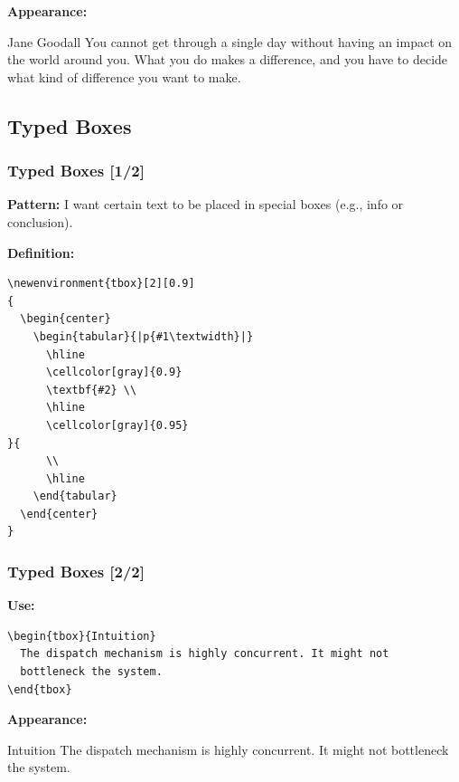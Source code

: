 {\begin{frame}[fragile]
  \pause
  \vspace{5mm}
  \textbf{Appearance:}
  \begin{inspiration}{Jane Goodall}
  You cannot get through a single day without having an impact on the world around you. What you do makes a difference, and you have to decide what kind of difference you want to make.
  \end{inspiration}
\end{frame}

\subsection{Typed Boxes}
\begin{frame}[fragile]
  \frametitle{Typed Boxes [1/2]}
  \vspace{3mm}
  \textbf{Pattern:} I want certain text to be placed in special boxes (e.g., info or conclusion).
  
  \pause
  \vspace{5mm}
  \textbf{Definition:}
  \begin{verbatim}
\newenvironment{tbox}[2][0.9]
{
  \begin{center}
    \begin{tabular}{|p{#1\textwidth}|}
      \hline
      \cellcolor[gray]{0.9}
      \textbf{#2} \\
      \hline
      \cellcolor[gray]{0.95}
}{
      \\
      \hline
    \end{tabular}
  \end{center}
}
  \end{verbatim}
\end{frame}
\begin{frame}[fragile]
  \frametitle{Typed Boxes [2/2]}
  \vspace{3mm}
  \textbf{Use:}
  \begin{verbatim}
\begin{tbox}{Intuition}
  The dispatch mechanism is highly concurrent. It might not
  bottleneck the system.
\end{tbox}
  \end{verbatim}
  
  \pause
  \vspace{5mm}
  \textbf{Appearance:}
  \begin{tbox}{Intuition}
    The dispatch mechanism is highly concurrent. It might not bottleneck the system.
  \end{tbox}
\end{frame}

}

